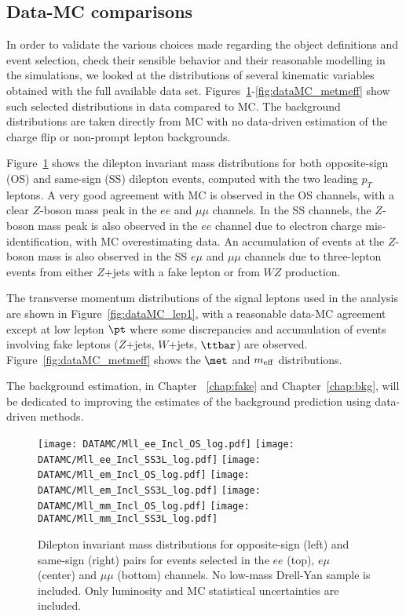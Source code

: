 \subsection{Data-MC comparisons}
\label{subsec:sec.strategy.selection_DataMC}


In order to validate the various choices made regarding the object definitions and event selection, 
check their sensible behavior and their reasonable modelling in the simulations, 
we looked at the distributions of several kinematic variables obtained with the full available data set.
Figures~\ref{fig:dataMC_2lep}-\ref{fig:dataMC_metmeff} show such selected distributions in data compared to MC. 
The background distributions are taken directly from MC with no data-driven estimation of the charge flip or non-prompt lepton backgrounds.

Figure~\ref{fig:dataMC_2lep} shows the dilepton invariant mass distributions for both opposite-sign (OS) and same-sign (SS) dilepton events, 
computed with the two leading $p_T$ leptons. 
A very good agreement with MC is observed in the OS channels, with a clear $Z$-boson mass peak in the $ee$ and $\mu\mu$ channels. 
In the SS channels, the $Z$-boson mass peak is also observed in the $ee$ channel due to electron charge mis-identification, with MC overestimating data.%
An accumulation of events at the $Z$-boson mass is also observed in the SS $e\mu$ and $\mu\mu$ channels due to three-lepton events 
from either $Z$+jets with a fake lepton or from $WZ$ production.  

The transverse momentum distributions of the signal leptons used in the analysis are shown in Figure~\ref{fig:dataMC_lep1}, with a reasonable data-MC agreement except at low 
lepton $\pt$ where some discrepancies and accumulation of events involving fake leptons ($Z$+jets, $W$+jets, $\ttbar$) are observed. 
Figure~\ref{fig:dataMC_metmeff} shows the $\met$ and $m_{\rm eff}$ distributions.

The background estimation, in Chapter ~\ref{chap:fake} and Chapter~\ref{chap:bkg}, will be dedicated to improving the estimates of the background prediction using data-driven methods.

\begin{figure}[htb!]
\centering
{\texttt{[image: DATAMC/Mll\_ee\_Incl\_OS\_log.pdf]}}
{\texttt{[image: DATAMC/Mll\_ee\_Incl\_SS3L\_log.pdf]}}
{\texttt{[image: DATAMC/Mll\_em\_Incl\_OS\_log.pdf]}}
{\texttt{[image: DATAMC/Mll\_em\_Incl\_SS3L\_log.pdf]}}
{\texttt{[image: DATAMC/Mll\_mm\_Incl\_OS\_log.pdf]}}
{\texttt{[image: DATAMC/Mll\_mm\_Incl\_SS3L\_log.pdf]}}
\caption{Dilepton invariant mass distributions for opposite-sign (left) and same-sign (right) pairs for events selected in the $ee$ (top), $e\mu$ (center) and $\mu\mu$ (bottom) channels. No low-mass Drell-Yan sample is included. Only luminosity and MC statistical uncertainties are included.
}
\label{fig:dataMC_2lep}
\end{figure}

